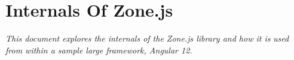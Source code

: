 \chapter{Internals Of Zone.js}

\emph{This document explores the internals of the Zone.js library and how it is}
\emph{used from within a sample large framework, Angular 12.}






